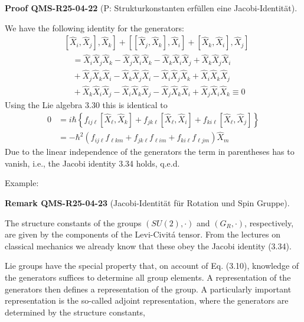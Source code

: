 \documentclass[10pt, letterpaper]{article}
\newcommand{\CustomHeading}[3]{%
  \par\medskip\noindent%
  \textbf{#1 #2} \textnormal{(#3)}.\enskip%
}
\newenvironment{REM}[2]{\begin{unitbox}\CustomHeading{Remark}{#1}{#2}}{\end{unitbox}}
\newenvironment{PROOF}[2]{\begin{unitbox}\CustomHeading{Proof}{#1}{#2}}{\end{unitbox}}
\begin{document}
\begin{PROOF}{QMS-R25-04-22}{P: Strukturkonstanten erfüllen eine Jacobi-Identität}
We have the following identity for the generators:
$$
\begin{aligned}
& \left.\left.\left[\hat{X}_{i}, \hat{X}_{j}\right], \hat{X}_{k}\right]+\left[\left[\hat{X}_{j}, \hat{X}_{k}\right], \hat{X}_{i}\right]+\left[\hat{X}_{k}, \hat{X}_{i}\right], \hat{X}_{j}\right] \\
& \quad=\hat{X}_{i} \hat{X}_{j} \hat{X}_{k}-\hat{X}_{j} \hat{X}_{i} \hat{X}_{k}-\hat{X}_{k} \hat{X}_{i} \hat{X}_{j}+\hat{X}_{k} \hat{X}_{j} \hat{X}_{i} \\
& \quad+\hat{X}_{j} \hat{X}_{k} \hat{X}_{i}-\hat{X}_{k} \hat{X}_{j} \hat{X}_{i}-\hat{X}_{i} \hat{X}_{j} \hat{X}_{k}+\hat{X}_{i} \hat{X}_{k} \hat{X}_{j} \\
& \quad+\hat{X}_{k} \hat{X}_{i} \hat{X}_{j}-\hat{X}_{i} \hat{X}_{k} \hat{X}_{j}-\hat{X}_{j} \hat{X}_{k} \hat{X}_{i}+\hat{X}_{j} \hat{X}_{i} \hat{X}_{k} \equiv 0
\end{aligned}
$$
Using the Lie algebra 3.30 this is identical to
$$
\begin{aligned}
0 & =i \hbar\left\{f_{i j \ell}\left[\hat{X}_{\ell}, \hat{X}_{k}\right]+f_{j k \ell}\left[\hat{X}_{\ell}, \hat{X}_{i}\right]+f_{k i \ell}\left[\hat{X}_{\ell}, \hat{X}_{j}\right]\right\} \\
& =-\hbar^{2}\left(f_{i j \ell} f_{\ell k m}+f_{j k \ell} f_{\ell i m}+f_{k i \ell} f_{\ell j m}\right) \hat{X}_{m}
\end{aligned}
$$
Due to the linear independence of the generators the term in parentheses has to vanish, i.e., the Jacobi identity 3.34 holds, q.e.d.
\end{PROOF}


Example: 

\begin{REM}{QMS-R25-04-23}{Jacobi-Identität für Rotation und Spin Gruppe}
The structure constants of the groups $(S U(2), \cdot)$ and $\left(G_{R}, \cdot\right)$, respectively, are given by the components of the Levi-Civitá tensor. From the lectures on classical mechanics we already know that these obey the Jacobi identity (3.34).
\end{REM}


Lie groups have the special property that, on account of Eq. (3.10), knowledge of the generators suffices to determine all group elements. A representation of the generators then defines a representation of the group. A particularly important representation is the so-called adjoint representation, where the generators are determined by the structure constants,
\end{document}
